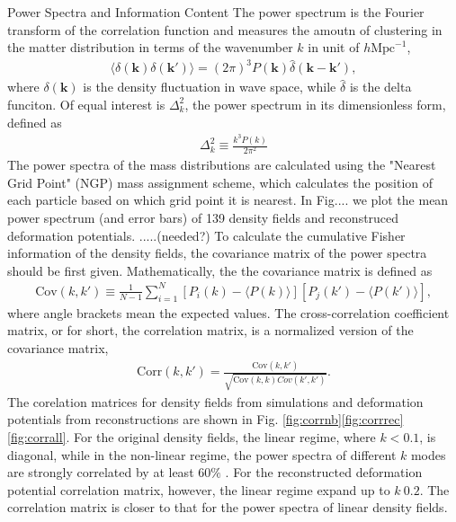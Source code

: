 \begin{section}{Power Spectra and Information Content}
  \label{sec:Power Spectra and Information Content}
    The power spectrum is the Fourier transform of the correlation function and measures the amoutn of clustering in the matter distribution in terms of the wavenumber $k$ in unit of $h \mathrm{Mpc}^{-1}$,
\begin{align}
    \langle \delta \left( \bm{k} \right) \delta \left( \bm{k'}\right) \rangle =\left( 2\pi \right) ^3 P \left( \bm{k} \right) \hat{\delta} \left( \bm{k}-\bm{k'} \right),
\end{align}
where $\delta \left( \bm{k} \right)$ is the density fluctuation in wave space, while $\hat{\delta}$ is the delta funciton. Of equal interest is $\Delta ^2_k$, the power spectrum in its dimensionless form, defined as
\begin{align}
    \Delta ^2_k \equiv \frac{k^3 P \left( k \right)}{2\pi ^2}
\end{align}
    The power spectra of the mass distributions are calculated using the "Nearest Grid Point" (NGP) mass assignment scheme, which calculates the position of each particle based on which grid point it is nearest. In Fig.... we plot the mean power spectrum (and error bars) of 139 density fields and reconstruced deformation potentials. .....(needed?)
    To calculate the cumulative Fisher information of the density fields, the covariance matrix of the power spectra should be first given. Mathematically, the the covariance matrix is defined as
\begin{align}
    \mathrm{Cov}\left(k,k'\right)\equiv \frac{1}{N-1}\sum_{i=1}^{N}\left[ P_i \left( k \right) - \langle P \left( k \right) \rangle \right]\left[ P_j \left( k' \right) - \langle P \left( k' \right)\rangle \right],
\end{align}
where angle brackets mean the expected values. 
    The cross-correlation coefficient matrix, or for short, the correlation matrix, is a normalized version of the covariance matrix,
\begin{align}
    \mathrm{Corr}\left(k,k'\right)=\frac{\mathrm{Cov}\left(k,k'\right)}{\sqrt{\mathrm{Cov}\left(k,k\right)Cov\left(k',k'\right)}}.
\end{align}
The corelation matrices for density fields from simulations and deformation potentials from reconstructions are shown in Fig. \ref{fig:corrnb}\ref{fig:corrrec} \ref{fig:corrall}. For the original density fields, the linear regime, where $k<0.1$, is diagonal, while in the non-linear regime, the power spectra of different $k$ modes are strongly correlated by at least $60\%$ . For the reconstructed deformation potential correlation matrix, however, the linear regime expand up to $k~0.2$. The correlation matrix is closer to that for the power spectra of linear density fields.

\end{section}
